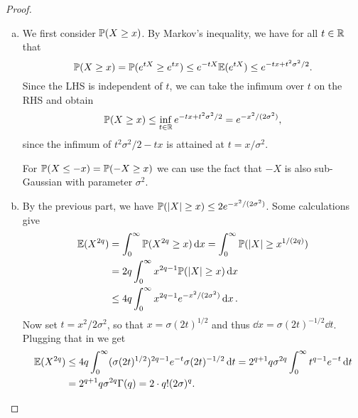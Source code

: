 \begin{proof}
    \begin{enumerate}[(a)]
        \item We first consider $\mathbb P(X \geq x)$. 
        By Markov's inequality, we have for all $t \in \mathbb R$ that
        \[
        \mathbb P(X \geq x) = \mathbb P(e^{tX} \geq e^{tx}) \leq e^{-tX} \mathbb E(e^{tX}) \leq e^{-tx + t^2\sigma^2/2}.  
        \]
        Since the LHS is independent of $t$, we can take the infimum over $t$ on the RHS and obtain
        \[
        \mathbb P(X \geq x) \leq \inf_{t \in \mathbb R} e^{-tx + t^2\sigma^2/2} = e^{-x^2/(2\sigma^2)}, 
        \]
        since the infimum of $t^2\sigma^2/2 - tx$ is attained at $t = x/\sigma^2$. 
        
        For $\mathbb P(X \leq -x) = \mathbb P(-X \geq x)$ we can use the fact that $-X$ is also sub-Gaussian with parameter $\sigma^2$. 
        
        \item By the previous part, we have $\mathbb P(\abs{X} \geq x) \leq 2 e^{-x^2/(2\sigma^2)}$. Some calculations give
        \begin{align*}
            \mathbb E(X^{2q}) &= \int_0^\infty \mathbb P(X^{2q} \geq x) \dd{x} = \int_0^\infty \mathbb P(\abs{X} \geq x^{1/(2q)}) \\
            &= 2q \int_0^\infty x^{2q - 1} \mathbb P(\abs{X}\geq x)\dd{x} \\
             &\leq 4q \int_0^\infty x^{2q - 1} e^{-x^2/(2\sigma^2)} \dd{x}.
        \end{align*}
    Now set $t = x^2/2\sigma^2$, so that $x = \sigma (2t)^{1/2}$ and thus $\dd{x} = \sigma (2t)^{-1/2} \dd{t}$. Plugging that in we get
    \begin{align*}
    \mathbb E(X^{2q}) &\leq 4q \int_0^\infty (\sigma(2t)^{1/2})^{2q - 1} e^{-t} \sigma (2t)^{-1/2} \dd{t} = 2^{q+1} q \sigma^{2q} \int_0^\infty t^{q-1} e^{-t} \dd{t} \\
    &= 2^{q+1} q \sigma^{2q} \Gamma(q) = 2 \cdot q! (2\sigma)^q. 
    \end{align*}


\end{enumerate}
\end{proof}

